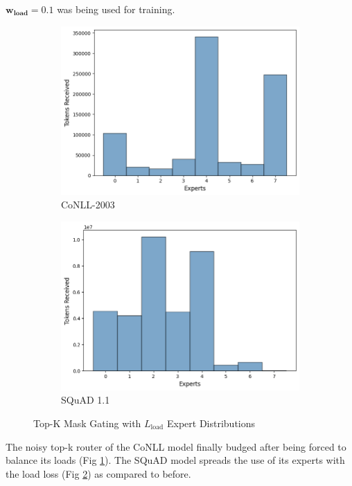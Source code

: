 \documentclass[12pt]{article}
\begin{document}
$\boldsymbol{w_{\text{load}}=0.1}$ was being used for training.
\begin{figure}[h]
\centering
\begin{subfigure}{.5\textwidth}
  \centering
  \includegraphics[width=1\linewidth]{report_images/conll/load.png}
  \caption{CoNLL-2003}
  \label{fig:load_conll}
\end{subfigure}%
\begin{subfigure}{.5\textwidth}
  \centering
  \includegraphics[width=1\linewidth]{report_images/squad/load.png}
  \caption{SQuAD 1.1}
  \label{fig:load_squad}
\end{subfigure}
\caption{Top-K Mask Gating with $L_{\text{load}}$ Expert Distributions}
\label{fig:load}
\end{figure}
\FloatBarrier
\noindent
The noisy top-k router of the CoNLL model finally budged after being forced to balance its loads (Fig \ref{fig:load_conll}). The SQuAD model spreads the use of its experts with the load loss (Fig \ref{fig:load_squad}) as compared to before.
\end{document}
